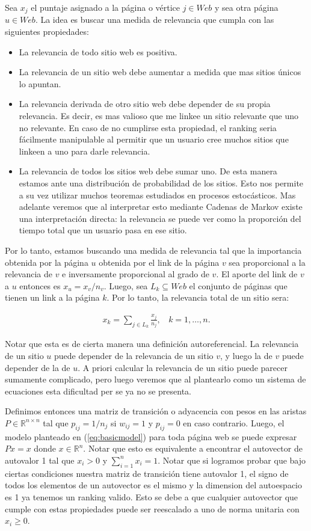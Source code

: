 Sea $x_j$ el puntaje asignado a la página o vértice $j \in Web$ y sea otra página $u \in Web$. La idea es buscar una medida de relevancia que cumpla con las siguientes propiedades:
\begin{itemize}
  \item La relevancia de todo sitio web es positiva.
  \item La relevancia de un sitio web debe aumentar a medida que mas sitios únicos lo apuntan.
  \item La relevancia derivada de otro sitio web debe depender de su propia relevancia. Es decir, es mas valioso que me linkee un sitio relevante que uno no relevante. En caso de no cumplirse esta propiedad, el ranking seria fácilmente manipulable al permitir que un usuario cree muchos sitios que linkeen a uno para darle relevancia.
  \item La relevancia de todos los sitios web debe sumar uno. De esta manera estamos ante una distribución de probabilidad de los sitios. Esto nos permite a su vez utilizar muchos teoremas estudiados en procesos estocásticos. Mas adelante veremos que al interpretar esto mediante Cadenas de Markov existe una interpretación directa: la relevancia se puede ver como la proporción del tiempo total que un usuario pasa en ese sitio.
\end{itemize} 

Por lo tanto, estamos buscando una medida de relevancia tal que la importancia obtenida por la página $u$ obtenida por el link de la página $v$ sea proporcional a la relevancia de $v$ e inversamente proporcional al grado de $v$. El aporte del link de $v$ a $u$ entonces es $x_u = x_v / n_v$. Luego, sea $L_k \subseteq Web$ el conjunto de páginas que tienen un link a la página $k$. Por lo tanto, la relevancia total de un sitio sera:

\begin{eqnarray}
x_k = \sum_{j \in L_k} \frac{x_j}{n_j},~~~~k = 1,\dots,n. \label{eq:basicmodel}
\end{eqnarray}

Notar que esta es de cierta manera una definición autoreferencial. La relevancia de un sitio $u$ puede depender de la relevancia de un sitio $v$, y luego la de $v$ puede depender de la de $u$. A priori calcular la relevancia de un sitio puede parecer sumamente complicado, pero luego veremos que al plantearlo como un sistema de ecuaciones esta dificultad per se ya no se presenta.

Definimos entonces una matriz de transición o adyacencia con pesos en las aristas $P \in \mathbb{R}^{n \times n}$ tal que $p_{ij} = 1 / n_j$ si $w_{ij} = 1$ y $p_{ij} = 0$ en caso contrario. Luego, el modelo planteado en (\ref{eq:basicmodel}) para toda página web se puede expresar $Px = x$ donde $x \in \mathbb{R}^n$. Notar que esto es equivalente a encontrar el autovector de autovalor 1 tal que $x_i > 0$ y $\sum_{i=1}^{n} x_i = 1$. Notar que si logramos probar que bajo ciertas condiciones nuestra matriz de transición tiene autovalor 1, el signo de todos los elementos de un autovector es el mismo y la dimension del autoespacio es 1 ya tenemos un ranking valido. Esto se debe a que cualquier autovector que cumple con estas propiedades puede ser reescalado a uno de norma unitaria con $x_i \geq 0$.

